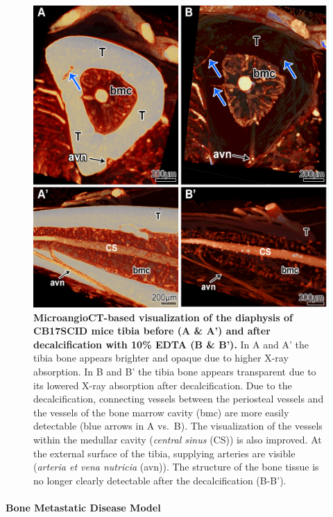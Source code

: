 \begin{figure}
\hypertarget{fig:2}{%
\centering
\includegraphics{images/Fig2_Decalcification.png}
\caption{\textbf{MicroangioCT-based visualization of the diaphysis of CB17SCID mice tibia before (A \& A') and after decalcification with 10\% EDTA (B \& B').}
In A and A' the tibia bone appears brighter and opaque due to higher X-ray absorption.
In B and B' the tibia bone appears transparent due to its lowered X-ray absorption after decalcification.
Due to the decalcification, connecting vessels between the periosteal vessels and the vessels of the bone marrow cavity (bmc) are more easily detectable (blue arrows in A vs.~B).
The visualization of the vessels within the medullar cavity (\emph{central sinus} (CS)) is also improved.
At the external surface of the tibia, supplying arteries are visible (\emph{arteria et vena nutricia} (avn)).
The structure of the bone tissue is no longer clearly detectable after the decalcification (B-B').}\label{fig:2}
}
\end{figure}

\hypertarget{bone-metastatic-disease-model}{%
\paragraph{Bone Metastatic Disease Model}\label{bone-metastatic-disease-model}}

